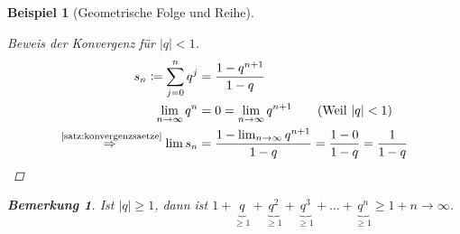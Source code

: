 \documentclass[11pt, twoside, a4paper]{article}
\theoremstyle{plain}
\newtheorem{bemerkung}[blockelement]{Bemerkung}
\newtheorem{beispiel}[blockelement]{Beispiel}
\newcommand{\abs}[1]{\left\lvert#1\right\rvert}
\newcommand{\impl}[0]{\Rightarrow{}}
\newcommand{\fromto}{\rightarrow{}}
\newcommand{\definedas}[0]{\coloneqq}
\newcommand{\annot}[3][]{\overset{\text{#3}}#1{#2}}
\begin{document}
\begin{beispiel}[Geometrische Folge und Reihe]

        \begin{proof}[Beweis der Konvergenz für $\abs{q} < 1$]
            \marginnote{[5. Dez]}
            \begin{align*}
                s_n\definedas \sum_{j=0}^{n} q^j &= \frac{1-q^{n+1}}{1-q}\\
                \lim_{n\fromto\infty} q^n &= 0 = \lim_{n\fromto\infty} q^{n+1}\tag{Weil $\abs{q} < 1$}\\
                \annot{\impl}{\ref{satz:konvergenzsaetze}} \lim s_n &= \frac{1-\lim_{n\fromto\infty} q^{n+1}}{1-q} = \frac{1-0}{1-q} = \frac{1}{1-q}\qedhere
            \end{align*}
        \end{proof}
        \begin{bemerkung}
            Ist $\abs{q}\geq 1$, dann ist $1+\underbrace{q}_{\geq 1}+\underbrace{q^2}_{\geq 1}+\underbrace{q^3}_{\geq 1}+\dots + \underbrace{q^n}_{\geq 1} \geq 1+n\fromto\infty$.
        \end{bemerkung}
    \end{beispiel}

    \newpage
\end{document}
